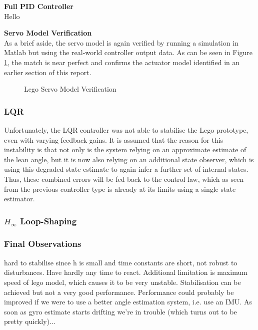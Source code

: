 \textbf{Full PID Controller} \\
Hello

\textbf{Servo Model Verification} \\
As a brief aside, the servo model is again verified by running a simulation in Matlab but using the real-world controller output data. As can be seen in Figure \ref{fig:LegoServoIDPart2}, the match is near perfect and confirms the actuator model identified in an earlier section of this report. \\

\begin{figure}[H]
\centering
{}
	\caption{Lego Servo Model Verification}
	\label{fig:LegoServoIDPart2}
\end{figure}

\subsubsection{LQR}
Unfortunately, the LQR controller was not able to stabilise the Lego prototype, even with varying feedback gains. It is assumed that the reason for this instability is that not only is the system relying on an approximate estimate of the lean angle, but it is now also relying on an additional state observer, which is using this degraded state estimate to again infer a further set of internal states. Thus, these combined errors will be fed back to the control law, which as seen from the previous controller type is already at its limits using a single state estimator.

\subsubsection{$H_{\infty}$ Loop-Shaping}

\subsubsection{Final Observations}
hard to stabilise since h is small and time constants are short, not robust to disturbances. Have hardly any time to react. Additional limitation is maximum speed of lego model, which causes it to be very unstable. Stabilisation can be achieved but not a very good performance. Performance could probably be improved if we were to use a better angle estimation system, i.e. use an IMU. As soon as gyro estimate starts drifting we're in trouble (which turns out to be pretty quickly)...